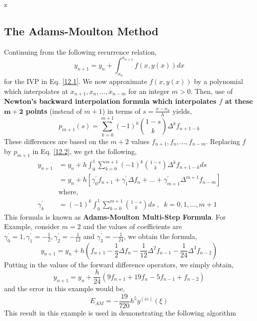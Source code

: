 z\documentclass[a4paper,12pt,twoside]{book}
\newcommand{\nll}[0]{\newline\newline}
\renewcommand{\d}[0]{\prime}
\begin{document}
\subsection{The Adams-Moulton Method}
Continuing from the following recurrence relation,
\[y_{n+1} = y_n + \int_{x_n}^{x_{n+1}} f(x,y(x))dx\]
for the IVP in Eq. \ref{12.1}. We now approximate $f(x,y(x))$ by a polynomial which interpolates at $x_{n+1}, x_n, \dots, x_{n-m}$ for an integer $m > 0$. Then, use of\textbf{ Newton's backward interpolation formula which interpolates $f$ at these $\mathbf{m+2}$ points} (instead of $m+1$) in terms of $s = \frac{x-x_n}{h}$ yields,
\[ p_{m+1}(s) = \sum_{k=0}^{m+1} (-1)^k \binom{1-s}{k}\Delta^k f_{n+1-k}\]
These differences are based on the $m+2$ values $f_{n+1}, f_n,\dots, f_{n-m}$. Replacing $f$ by $p_{m+1}$ in Eq. \ref{12.2}, we get the following,
\begin{equation}
    \begin{split}
        y_{n+1} &= y_n + h\int_0^1 \sum_{k=0}^{m+1} (-1)^k \binom{1-s}{k}\Delta^k f_{n+1-k} ds\\
        &= y_n + h\left[ \gamma_0^\d f_{n+1} + \gamma_1^\d\Delta f_n + \dots + \gamma^\d_{m+1} \Delta^{m+1} f_{n-m} \right]\\
        &\text{where,}\\
        \gamma^\d_k &= (-1)^k\int_0^1 \sum_{k=0}^{m+1} \binom{1-s}{k}ds\;,\;\;k=0,1,\dots,m+1
    \end{split}
\end{equation}
This formula is known as \textbf{Adams-Moulton Multi-Step Formula}.
\nll
For Example, consider $m=2$ and the values of coefficients are $\gamma^\d_0 = 1,\gamma_1^\d = -\frac{1}{2}, \gamma_2^\d = -\frac{1}{12}$ and $\gamma_3^\d = -\frac{1}{24}$, we obtain the formula,
\[y_{n+1} = y_n + h\left( f_{n+1} -\frac{1}{2} \Delta f_n -\frac{1}{12}\Delta^2 f_{n-1} -\frac{1}{24} \Delta^3 f_{n-2}  \right)\]
Putting in the values of the forward difference operators, we simply obtain,
\begin{equation}
\label{12.7}
     y_{n+1} = y_n + \frac{h}{24} (9f_{n+1} + 19f_n -5f_{n-1} + f_{n-2})
\end{equation}
and the error in this example would be,
\[E_{AM} = -\frac{19}{720}h^5y^{(iv)}(\xi)\]
This result in this example is used in demonstrating the following algorithm
\end{document}
